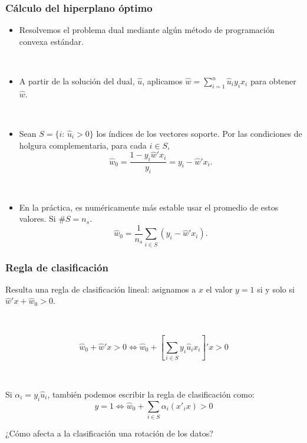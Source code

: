 \documentclass[dvipsnames, pdflatex,slidecentered]{beamer}
\begin{document}
\begin{frame}[plain]
\frametitle{Cálculo del hiperplano óptimo}

\begin{itemize}
\item Resolvemos el problema dual mediante algún método de programación convexa estándar.

\

\item A partir de la solución del dual, $\hat u$, aplicamos $\hat w = \sum_{i=1}^n \hat u_i y_i x_i$ para obtener $\hat w$.

\

\item Sean $S=\{i:\, \hat u_i>0\}$ los índices de los vectores soporte.
Por las condiciones de holgura complementaria,  para cada $i\in S$,
\[
\hat w_0 = \frac{1-y_i\hat w'x_i}{y_i} = y_i-\hat w'x_i.
\] 

\

\item En la práctica, es numéricamente más estable usar el promedio de estos valores. Si $\# S=n_s$.
\[
\hat w_0 = \frac{1}{n_s} \sum_{i\in S} (y_i-\hat w'x_i).
\]
\end{itemize}


\end{frame}
\begin{frame}[plain]
\frametitle{Regla de clasificación}

Resulta una regla de clasificación lineal: asignamos a $x$ el valor $y=1$ si y solo si $\hat{w}'x+\hat w_0>0$.

\

\[
\hat w_0 + \hat{w}'x>0 \Leftrightarrow \hat w_0 + \left[\sum_{i\in S} y_i \hat u_i x_i\right]' x > 0 
\]

\

Si $\alpha_i=y_i\hat u_i$, también podemos escribir la regla de clasificación como:
\[
y = 1 \Leftrightarrow  \hat w_0 + \sum_{i\in S} \alpha_i (x'_ix)>0
\]

¿Cómo afecta a la clasificación una rotación de los datos?

\end{frame}
\end{document}
